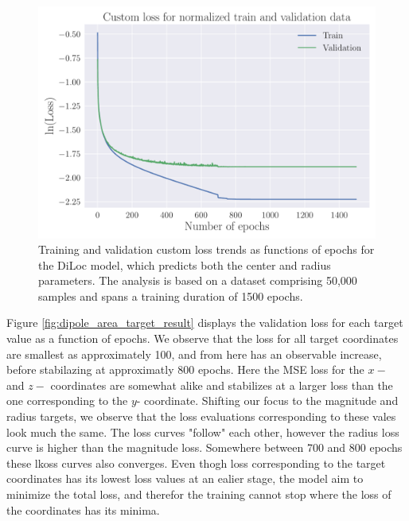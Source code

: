 \documentclass[a4paper, UKenglish, 11pt]{uiomaster}
\begin{document}
\begin{figure}[!htb]
    \centering
    \includegraphics[width=\linewidth]{figures/NN_area/Custom_Loss_area_seed_42_cnn_32_0.001_0.35_0.1_0_1500_(0).pdf}
    \caption{Training and validation custom loss trends as functions of epochs for the DiLoc model, which predicts both the center and radius parameters. The analysis is based on a dataset comprising 50,000 samples and spans a training duration of 1500 epochs.}
    \label{fig:dipole_area_result}
\end{figure}

Figure \ref{fig:dipole_area_target_result} displays the validation loss for each target value as a function of epochs. We observe that the loss for all target coordinates are smallest as approximately 100, and from here has an observable increase, before stabilazing at approximatly 800 epochs. Here the MSE loss for the $x-$ and $z-$ coordinates are somewhat alike and stabilizes at a larger loss than the one corresponding to the $y$- coordinate. Shifting our focus to the magnitude and radius targets, we observe that the loss evaluations corresponding to these vales look much the same. The loss curves "follow" each other, however the radius loss curve is higher than the magnitude loss. Somewhere between 700 and 800 epochs these lkoss curves also converges. Even thogh loss corresponding to the target coordinates has its lowest loss values at an ealier stage, the model aim to minimize the total loss, and therefor the training cannot stop where the loss of the coordinates has its minima.
\end{document}
